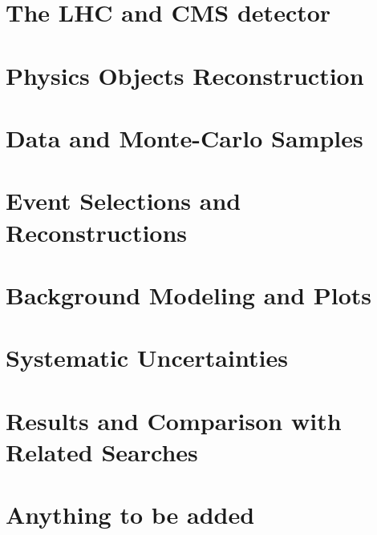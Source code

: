 \documentclass[11pt,a4paper,oldfontcommands]{memoir}
\begin{document}
\chapter{The LHC and CMS detector}

\chapter{Physics Objects Reconstruction}

\chapter{Data and Monte-Carlo Samples}

\chapter{Event Selections and Reconstructions}

\chapter{Background Modeling and Plots}

\chapter{Systematic Uncertainties}

\chapter{Results and Comparison with Related Searches}





\appendix

\chapter{Anything to be added}
\end{document}
